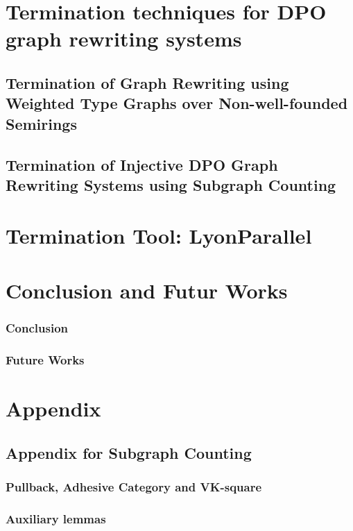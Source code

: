 \documentclass{book}
\begin{document}
\part{Termination techniques for DPO graph rewriting systems}
\chapter{Termination of Graph Rewriting using Weighted Type Graphs over Non-well-founded Semirings}
\label{part:morphisms_from_gls_to_grs}

  
\chapter{Termination of Injective DPO Graph Rewriting Systems using Subgraph Counting}
 \label{part:terminating_injective_dpo_grs}
 
 

\part{Termination Tool: LyonParallel}

\part{Conclusion and Futur Works}
\section{Conclusion}

\section{Future Works}


\part{Appendix}
\chapter{Appendix for Subgraph Counting}
\section*{Pullback, Adhesive Category and VK-square}

\section*{Auxiliary lemmas}

\end{document}
